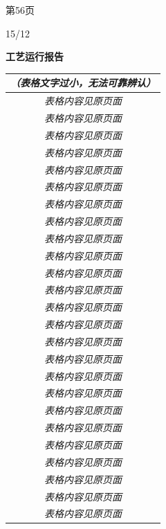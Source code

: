 \documentclass[UTF8,10pt,a4paper,fontset=fandol]{ctexart}
\newcommand{\handwritten}[1]{#1}
\begin{document}
\begin{minipage}[t]{0.47\textwidth}
\vspace{2pt}
第56页
\end{minipage}

\vspace{0.5em}

\handwritten{15/12}

\newpage

\noindent
\begin{minipage}[t]{0.47\textwidth}
\centering
\textbf{工艺运行报告}

\vspace{0.3em}
\small
\begin{tabularx}{\linewidth}{|c|X|}
\hline
\multicolumn{2}{c}{\textit{（表格文字过小，无法可靠辨认）}}\\
\hline
\multicolumn{2}{c}{\textit{表格内容见原页面}}\\
\hline
\multicolumn{2}{c}{\textit{表格内容见原页面}}\\
\hline
\multicolumn{2}{c}{\textit{表格内容见原页面}}\\
\hline
\multicolumn{2}{c}{\textit{表格内容见原页面}}\\
\hline
\multicolumn{2}{c}{\textit{表格内容见原页面}}\\
\hline
\multicolumn{2}{c}{\textit{表格内容见原页面}}\\
\hline
\multicolumn{2}{c}{\textit{表格内容见原页面}}\\
\hline
\multicolumn{2}{c}{\textit{表格内容见原页面}}\\
\hline
\multicolumn{2}{c}{\textit{表格内容见原页面}}\\
\hline
\multicolumn{2}{c}{\textit{表格内容见原页面}}\\
\hline
\multicolumn{2}{c}{\textit{表格内容见原页面}}\\
\hline
\multicolumn{2}{c}{\textit{表格内容见原页面}}\\
\hline
\multicolumn{2}{c}{\textit{表格内容见原页面}}\\
\hline
\multicolumn{2}{c}{\textit{表格内容见原页面}}\\
\hline
\multicolumn{2}{c}{\textit{表格内容见原页面}}\\
\hline
\multicolumn{2}{c}{\textit{表格内容见原页面}}\\
\hline
\multicolumn{2}{c}{\textit{表格内容见原页面}}\\
\hline
\multicolumn{2}{c}{\textit{表格内容见原页面}}\\
\hline
\multicolumn{2}{c}{\textit{表格内容见原页面}}\\
\hline
\multicolumn{2}{c}{\textit{表格内容见原页面}}\\
\hline
\multicolumn{2}{c}{\textit{表格内容见原页面}}\\
\hline
\multicolumn{2}{c}{\textit{表格内容见原页面}}\\
\hline
\multicolumn{2}{c}{\textit{表格内容见原页面}}\\
\hline
\multicolumn{2}{c}{\textit{表格内容见原页面}}\\
\hline
\multicolumn{2}{c}{\textit{表格内容见原页面}}\\
\hline
\end{tabularx}
\end{minipage}
\end{document}
